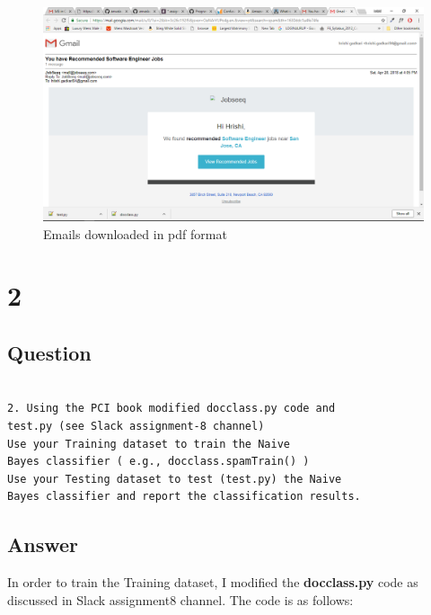 \documentclass[letterpaper,11pt]{article}
\begin{document}
\begin{figure}[h]
\centering
\includegraphics[scale=0.33]{pdf.png}
\caption{Emails downloaded in pdf format}
\label{fig:q1cali}
\end{figure}


\clearpage


\section*{2}

\subsection*{Question}

\begin{verbatim}

2. Using the PCI book modified docclass.py code and
test.py (see Slack assignment-8 channel)
Use your Training dataset to train the Naive 
Bayes classifier ( e.g., docclass.spamTrain() )
Use your Testing dataset to test (test.py) the Naive 
Bayes classifier and report the classification results.

\end{verbatim}
 \clearpage
\subsection*{Answer}		

In order to train the Training dataset, I modified the \textbf{docclass.py} code as discussed in Slack assignment8 channel. The code is as follows:


\end{document}
